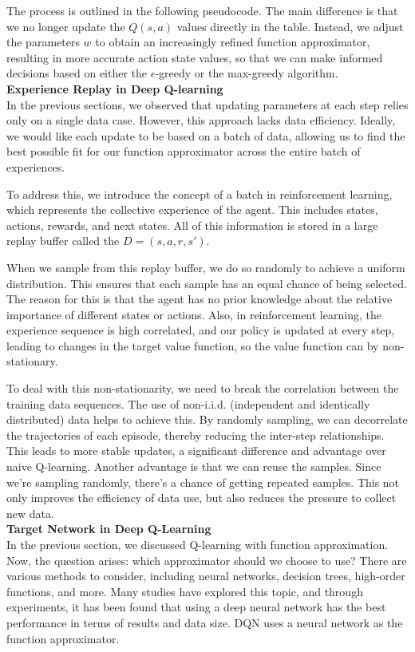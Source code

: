 \documentclass{article}
\begin{document}
The process is outlined in the following pseudocode. The main difference is that we no longer update the $Q(s,a)$ values directly in the table. Instead, we adjust the parameters $w$ to obtain an increasingly refined function approximator, resulting in more accurate action state values, so that we can make informed decisions based on either the $\epsilon$-greedy or the max-greedy algorithm.\\


\noindent
\textbf{Experience Replay in Deep Q-learning}\\
\noindent
In the previous sections, we observed that updating parameters at each step relies only on a single data case. However, this approach lacks data efficiency. Ideally, we would like each update to be based on a batch of data, allowing us to find the best possible fit for our function approximator across the entire batch of experiences.

To address this, we introduce the concept of a batch in reinforcement learning, which represents the collective experience of the agent. This includes states, actions, rewards, and next states. All of this information is stored in a large replay buffer called the $D = {(s,a,r,s')}$.

When we sample from this replay buffer, we do so randomly to achieve a uniform distribution. This ensures that each sample has an equal chance of being selected. The reason for this is that the agent has no prior knowledge about the relative importance of different states or actions. Also, in reinforcement learning, the experience sequence is high correlated, and our policy is updated at every step, leading to changes in the target value function, so the value function can by non-stationary.

To deal with this non-stationarity, we need to break the correlation between the training data sequences. The use of non-i.i.d. (independent and identically distributed) data helps to achieve this. By randomly sampling, we can decorrelate the trajectories of each episode, thereby reducing the inter-step relationships. This leads to more stable updates, a significant difference and advantage over naive Q-learning. Another advantage is that we can reuse the samples. Since we're sampling randomly, there's a chance of getting repeated samples. This not only improves the efficiency of data use, but also reduces the pressure to collect new data.\\


\noindent
\textbf{Target Network in Deep Q-Learning}\\
\noindent
In the previous section, we discussed Q-learning with function approximation. Now, the question arises: which approximator should we choose to use? There are various methods to consider, including neural networks, decision trees, high-order functions, and more. Many studies have explored this topic, and through experiments, it has been found that using a deep neural network has the best performance in terms of results and data size. DQN uses a neural network as the function approximator.
\end{document}
